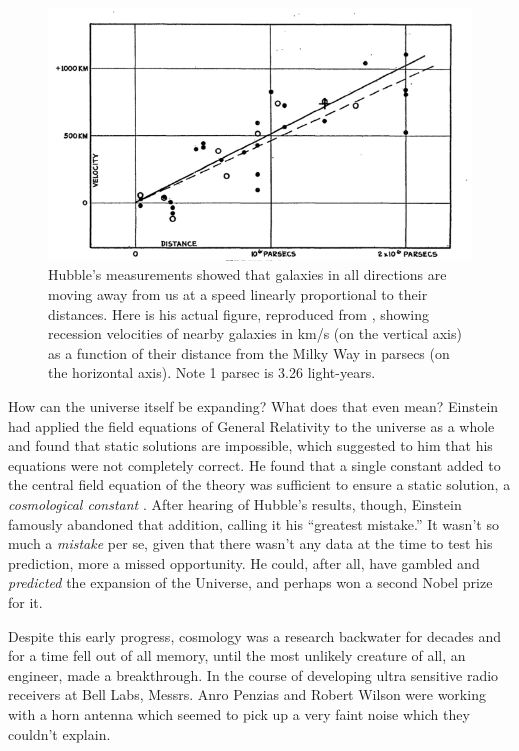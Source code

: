 \begin{figure}
\includegraphics[width=6in]{cocktail_party_intro/hubble_diagram.png}
\caption{Hubble's measurements showed that galaxies in all directions are moving away from us at a speed linearly proportional to their distances. Here is his actual figure, reproduced from \citet{hubble29}, showing recession velocities of nearby galaxies in km/s (on the vertical axis) as a function of their distance from the Milky Way in parsecs (on the horizontal axis). Note 1 parsec is 3.26 light-years.}
\label{fig:hubbleslaw}
\end{figure}

How can the universe itself be expanding? What does that even mean? Einstein had applied the field equations of General Relativity to the universe as a whole and found that static solutions are impossible, which suggested to him that his equations were not completely correct. He found that a single constant added to the central field equation of the theory was sufficient to ensure a static solution, a \textit{cosmological constant} \citep{einstein17}. After hearing of Hubble's results, though, Einstein famously abandoned that addition, calling it his ``greatest mistake.'' It wasn't so much a \textit{mistake} per se, given that there wasn't any data at the time to test his prediction, more a missed opportunity. He could, after all, have gambled and \textit{predicted} the expansion of the Universe, and perhaps won a second Nobel prize for it.

Despite this early progress, cosmology was a research backwater for decades and for a time fell out of all memory, until the most unlikely creature of all, an engineer, made a breakthrough. In the course of developing ultra sensitive radio receivers at Bell Labs, Messrs. Anro Penzias and Robert Wilson were working with a horn antenna which seemed to pick up a very faint noise which they couldn't explain. 

